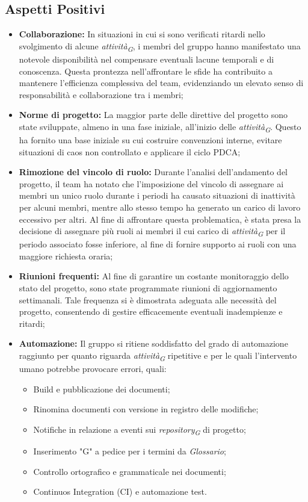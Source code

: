 \subsection{Aspetti Positivi}
\begin{itemize}
    \item \textbf{Collaborazione:} In situazioni in cui si sono verificati ritardi nello svolgimento di alcune \textit{attività}\textsubscript{\textit{G}}, i membri del gruppo hanno manifestato una notevole disponibilità nel compensare eventuali lacune temporali e di conoscenza. Questa prontezza nell'affrontare le sfide ha contribuito a mantenere l'efficienza complessiva del team, evidenziando un elevato senso di responsabilità e collaborazione tra i membri;
    \item \textbf{Norme di progetto:} La maggior parte delle direttive del progetto sono state sviluppate, almeno in una fase iniziale, all'inizio delle \textit{attività}\textsubscript{\textit{G}}. Questo ha fornito una base iniziale su cui costruire convenzioni interne, evitare situazioni di caos non controllato e applicare il ciclo PDCA;
    \item \textbf{Rimozione del vincolo di ruolo:} Durante l'analisi dell'andamento del progetto, il team ha notato che l'imposizione del vincolo di assegnare ai membri un unico ruolo durante i periodi ha causato situazioni di inattività per alcuni membri, mentre allo stesso tempo ha generato un carico di lavoro eccessivo per altri.
    Al fine di affrontare questa problematica, è stata presa la decisione di assegnare più ruoli ai membri il cui carico di \textit{attività}\textsubscript{\textit{G}} per il periodo associato fosse inferiore, al fine di fornire supporto ai ruoli con una maggiore richiesta oraria;
    \item \textbf{Riunioni frequenti:} Al fine di garantire un costante monitoraggio dello stato del progetto, sono state programmate riunioni di aggiornamento settimanali. Tale frequenza si è dimostrata adeguata alle necessità del progetto, consentendo di gestire efficacemente eventuali inadempienze e ritardi;
    \item \textbf{Automazione:} Il gruppo si ritiene soddisfatto del grado di automazione raggiunto per quanto riguarda \textit{attività}\textsubscript{\textit{G}} ripetitive e per le quali l'intervento umano potrebbe provocare errori, quali:
    \begin{itemize}
        \item Build e pubblicazione dei documenti;
        \item Rinomina documenti con versione in registro delle modifiche;
        \item Notifiche in relazione a eventi sui \textit{repository}\textsubscript{\textit{G}} di progetto;
        \item Inserimento "G" a pedice per i termini da \textit{Glossario};
        \item Controllo ortografico e grammaticale nei documenti;
        \item Continuos Integration (CI) e automazione test.
    \end{itemize}


\end{itemize}
